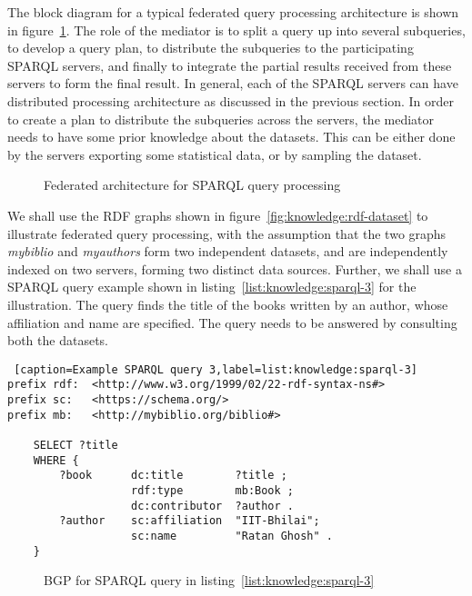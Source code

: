 The block diagram for a typical federated query processing architecture is shown in figure~\ref{fig:knowledge:federated-sparql}. The role
of the mediator is to split a query up into several subqueries, to develop a query plan, to distribute the subqueries to the participating 
SPARQL servers, and finally to integrate the partial results received from these servers to form the final result. In general, 
each of the SPARQL servers can have distributed processing architecture as discussed in the previous section. In order to create
a plan to distribute the subqueries across the servers, the mediator needs to have some prior knowledge about the datasets. 
This can be either done by the servers exporting some statistical data, or by sampling the dataset. 

\begin{figure}[!htpb]
	\centerline{
	}
	\caption{Federated architecture for SPARQL query processing}
	\label{fig:knowledge:federated-sparql}
\end{figure}

We shall use the RDF graphs shown in figure~\ref{fig:knowledge:rdf-dataset} to illustrate federated query processing, with the 
assumption that the two graphs {\it mybiblio} and {\it myauthors} form two independent datasets, and are independently indexed 
on two servers, forming two distinct data sources. Further, we shall use a SPARQL query example shown in 
listing~\ref{list:knowledge:sparql-3} for the illustration. The query finds the title of the books written by an author,  whose 
affiliation and name are specified. The query needs to be answered by consulting both the datasets.

\begin{lstlisting} [caption=Example SPARQL query 3,label=list:knowledge:sparql-3]
prefix rdf:  <http://www.w3.org/1999/02/22-rdf-syntax-ns#> 
prefix sc:   <https://schema.org/> 
prefix mb:   <http://mybiblio.org/biblio#>  

    SELECT ?title 
    WHERE {
        ?book      dc:title        ?title ;
                   rdf:type        mb:Book ;
                   dc:contributor  ?author .
        ?author    sc:affiliation  "IIT-Bhilai";
                   sc:name         "Ratan Ghosh" .
    }
\end{lstlisting}

\begin{figure}[!htpb]
	\centerline{
	}
	\caption{BGP for SPARQL query in listing~\ref{list:knowledge:sparql-3}}
	\label{fig:knowledge:bgp}
\end{figure}


